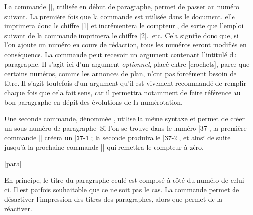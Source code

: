 La commande |\para|, utilisée en début de paragraphe, permet de passer au numéro suivant. La première fois que la commande est utilisée dans le document, elle imprimera donc le chiffre |1| et incrémentera le compteur , de sorte que l'emploi suivant de la commande imprimera le chiffre |2|,~etc. Cela signifie donc que, si l'on ajoute un numéro en cours de rédaction, tous les numéros seront modifiés en conséquence. La commande peut recevoir un argument contenant l'intitulé du paragraphe. Il s'agit ici d'un argument \emph{optionnel}, placé entre [crochets], parce que certains numéros, comme les annonces de plan, n'ont pas forcément besoin de titre. Il s'agit toutefois d'un argument qu'il est vivement recommandé de remplir chaque fois que cela fait sens, car il permettra notamment de faire référence au bon paragraphe en dépit des évolutions de la numérotation.

Une seconde commande, dénommée , utilise la même syntaxe et permet de créer un sous-numéro de paragraphe. Si l'on se trouve dans le \para numéro |37|, la première commande |\subpara| créera un |37-1|; la seconde produira le |37-2|, et ainsi de suite jusqu'à la prochaine commande |\para| qui remettra le compteur  à zéro.

\begin{macro}
\subpara %
\end{macro}

\begin{noprint}
{}
\setcounter{para}{0}
[para]%
\setcounter{subpara}{0}
\end{noprint}

En principe, le titre du paragraphe coulé est composé à côté du numéro de celui-ci. Il est parfois souhaitable que ce ne soit pas le cas. La commande  permet de désactiver l'impression des titres des paragraphes, alors que  permet de la réactiver.

\begin{noprint}
\newcommand{\paranames}{\@paranametrue}
\newcommand{\noparanames}{\@paranamefalse}
\end{noprint}

